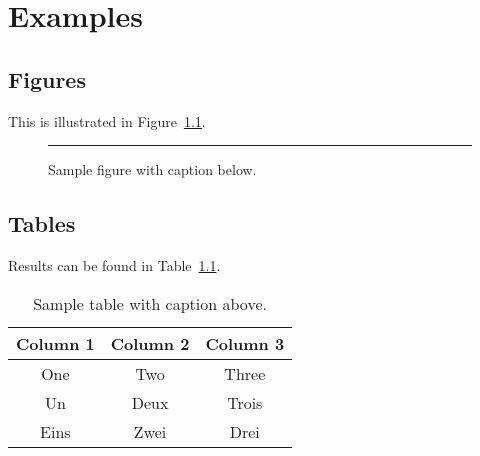 \chapter{Examples}
\label{chap:Examples}

\section{Figures}
\label{sec:Figures}

\blindtext
This is illustrated in Figure~\ref{fig:samplefigure}.

\begin{figure}[t]
    \centering
    \rule{0.99\textwidth}{5cm}
    \caption{Sample figure with caption below.}
    \label{fig:samplefigure}
\end{figure}

\Blindtext
\blindtext



\section{Tables}
\label{sec:Tables}

\blindtext
Results can be found in Table~\ref{tab:sampletable}.

\begin{table}[t]
    \caption{Sample table with caption above.}
    \centering
    \begin{tabular}{ccc}
        \toprule
        Column 1    &   Column 2    &   Column 3\\
        \midrule
        One         &   Two         &   Three\\
        Un          &   Deux        &   Trois\\
        Eins        &   Zwei        &   Drei\\
        \bottomrule
    \end{tabular}
    \label{tab:sampletable}
\end{table}

